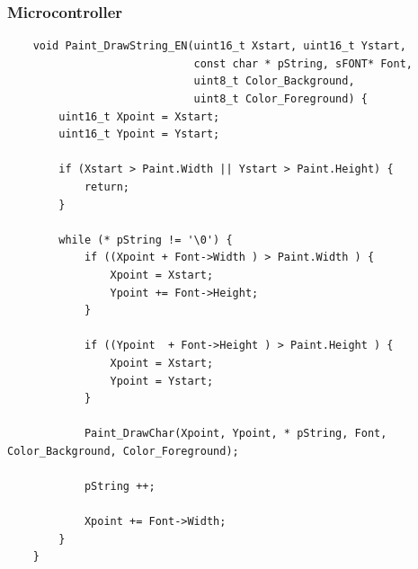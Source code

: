 \subsubsection{Microcontroller}
\lstset{style=mystyle}
\begin{lstlisting}
	void Paint_DrawString_EN(uint16_t Xstart, uint16_t Ystart,
						 	 const char * pString, sFONT* Font,
							 uint8_t Color_Background,
							 uint8_t Color_Foreground) {
		uint16_t Xpoint = Xstart;
		uint16_t Ypoint = Ystart;
	
		if (Xstart > Paint.Width || Ystart > Paint.Height) {
			return;
		}
	
		while (* pString != '\0') {
			if ((Xpoint + Font->Width ) > Paint.Width ) {
				Xpoint = Xstart;
				Ypoint += Font->Height;
			}
	
			if ((Ypoint  + Font->Height ) > Paint.Height ) {
				Xpoint = Xstart;
				Ypoint = Ystart;
			}
		
			Paint_DrawChar(Xpoint, Ypoint, * pString, Font, Color_Background, Color_Foreground);
	
			pString ++;
	
			Xpoint += Font->Width;
		}
	}
	
\end{lstlisting}

